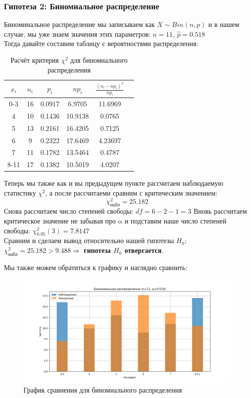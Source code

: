 \documentclass[12pt]{article}
\begin{document}
\subsubsection*{Гипотеза 2: Биномиальное распределение}
Биноминальное распределение мы записываем как $X \sim Bin(n,p)$ и в нашем случае, мы уже знаем значения этих параметров: $n = 11$, $\hat{p} = 0.518$ \\
Тогда давайте составим таблицу с вероятностями распределения:
\begin{table}[h]
\centering
\begin{tabular}{ |c|c|c|c|c|c| }
\hline
$x_i$ & $n_i$ & $p_i$ & $np_i$ & $\frac{(n_i - np_i)^2}{np_i}$ \\
\hline
0-3 & 16 & 0.0917 & 6.9705 & 11.6969 \\
\hline
4 & 10 & 0.1436 & 10.9138 & 0.0765 \\
\hline
5 & 13 & 0.2161 & 16.4205 & 0.7125 \\
\hline
6 & 9 & 0.2322 & 17.6469 & 4.23697 \\
\hline
7 & 11 & 0.1782 & 13.5464 & 0.4787 \\
\hline
8-11 & 17 & 0.1382 & 10.5019 & 4.0207 \\
\hline
\end{tabular}
\caption{Расчёт критерия $\chi^2$ для биномиального распределения}
\end{table}

Теперь мы также как и вы предыдущем пункте рассчитаем наблюдаемую статистику $\chi^2$, а после рассчитаеми сравним с критическим значением:
\[
\chi^2_{\text{набл}} = 25.182
\]
Снова рассчитаем число степеней свободы: $df = 6 - 2 - 1 = 3$ 
Вновь рассчитаем критическое значение не забывая про $\alpha$ и подставим наше число степеней свободы: $\chi^2_{0.95}(3) = 7.8147$ \\
Сравним и сделаем вывод относительно нашей гипотезы $H_0$: $\chi^2_{\text{набл}} = 25.182 > 9.488 \Rightarrow$ \textbf{гипотеза $H_0$ отвергается}.

Мы также можем обратиться к графику и наглядно сравнить:
\begin{figure}[h]
\centering
\includegraphics[scale=0.5]{binominal.png}
\caption{График сравнения для биномиального распределения}    
\end{figure}
\end{document}
